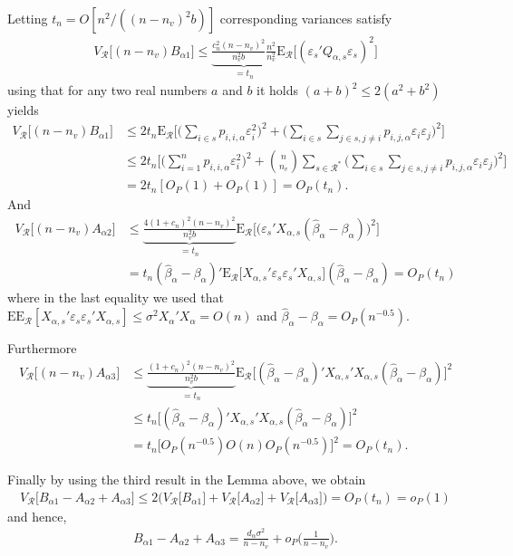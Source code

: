 \documentclass[Research_Module_ES.tex]{subfiles}
\begin{document}
Letting $t_n=O[n^2/((n-n_v)^2b)]$ corresponding variances satisfy
\begin{align*}
V_\mathcal{R}\bigl[(n-n_v)B_{\alpha1}\bigr]\le \underbrace{\frac{c_n^2(n-n_v)^2}{n_v^2b}\frac{n^2}{n_v^2}}_{=t_n} \mathrm{E}_\mathcal{R}\biggl[ (\varepsilon_s'Q_{\alpha,s}\varepsilon_s)^2\biggr]
\end{align*}
using that for any two real numbers $a$ and $b$ it holds $(a+b)^2\le 2(a^2+b^2)$ yields
\begin{align*}
V_\mathcal{R}\bigl[(n-n_v)B_{\alpha1}\bigr]
&\le 2t_n\mathrm{E}_\mathcal{R}\biggl[\biggl(\sum_{i\in s} p_{i,i,\alpha}\varepsilon_i^2\biggr)^2 + \biggl(\sum_{i\in s}\sum_{j\in s,j\neq i} p_{i,j,\alpha}\varepsilon_i\varepsilon_j\biggr)^2\biggr]\\
&\le 2t_n \biggl[\biggl(\sum_{i=1}^n p_{i,i,\alpha}\varepsilon_i^2\biggr)^2 + \binom{n}{n_v}\sum_{s\in \mathcal{R}^\ast}\biggl(\sum_{i\in s}\sum_{j\in s,j\neq i} p_{i,j,\alpha}\varepsilon_i\varepsilon_j\biggr)^2\biggr]\\
&= 2t_n [O_P(1)+O_P(1)]=O_P(t_n).
\end{align*}
And 
\begin{align*}
V_\mathcal{R}\bigl[(n-n_v)A_{\alpha2}\bigr]
&\le \underbrace{\frac{4(1+c_n)^2(n-n_v)^2}{n_v^2b}}_{=t_n}\mathrm{E}_\mathcal{R}\bigl[ \bigl(\varepsilon_s'X_{\alpha,s}(\hat{\beta}_\alpha-\beta_\alpha)\bigr)^2\bigr]\\
&= t_n (\hat{\beta}_\alpha-\beta_\alpha)'\mathrm{E}_\mathcal{R}\bigl[X_{\alpha,s}'\varepsilon_s \varepsilon_s'X_{\alpha,s}\bigr](\hat{\beta}_\alpha-\beta_\alpha) = O_P(t_n)
\end{align*}
where in the last equality we used that $\mathrm{E}\mathrm{E}_\mathcal{R}[X_{\alpha,s}'\varepsilon_s \varepsilon_s'X_{\alpha,s}]\le \sigma^2 X_\alpha'X_\alpha=O(n)$ and $\hat{\beta}_\alpha-\beta_\alpha=O_P(n^{-0.5})$.\

Furthermore
\begin{align*}
V_\mathcal{R}\bigl[(n-n_v)A_{\alpha3}\bigr]
&\le \underbrace{\frac{(1+c_n)^2(n-n_v)^2}{n_v^2b}}_{=t_n}\mathrm{E}_\mathcal{R}\bigl[(\hat{\beta}_\alpha-\beta_\alpha)'X_{\alpha,s}'X_{\alpha,s}(\hat{\beta}_\alpha-\beta_\alpha)\bigr]^2\\
&\le t_n \bigl[(\hat{\beta}_\alpha-\beta_\alpha)'X_{\alpha,s}'X_{\alpha,s}(\hat{\beta}_\alpha-\beta_\alpha)\bigr]^2\\
&= t_n \bigl[O_P(n^{-0.5})O(n)O_P(n^{-0.5})\bigr]^2=O_P(t_n).
\end{align*}

Finally by using the third result in the Lemma above, we obtain
\begin{align*}
V_\mathcal{R}\bigl[B_{\alpha1}-A_{\alpha2}+A_{\alpha3}\bigr] \le 2\bigl(V_\mathcal{R}\bigl[B_{\alpha1}\bigr]+V_\mathcal{R}\bigl[A_{\alpha2}\bigr]+V_\mathcal{R}\bigl[A_{\alpha3}\bigr]\bigr) = O_P(t_n)=o_P(1)
\end{align*}
and hence,
\begin{align*}
B_{\alpha1}-A_{\alpha2}+A_{\alpha3} = \frac{d_\alpha\sigma^2 }{n-n_v}+ o_P\biggl(\frac{1}{n-n_v}\biggr).
\end{align*}
\end{document}
